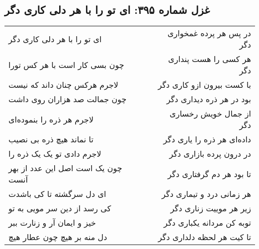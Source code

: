 \begin{center}
\section*{غزل شماره ۳۹۵: ای تو را با هر دلی کاری دگر}
\label{sec:395}
\begin{longtable}{l p{0.5cm} r}
ای تو را با هر دلی کاری دگر
&&
در پس هر پرده غمخواری دگر
\\
چون بسی کار است با هر کس تورا
&&
هر کسی را هست پنداری دگر
\\
لاجرم هرکس چنان داند که نیست
&&
با کست بیرون ازو کاری دگر
\\
چون جمالت صد هزاران روی داشت
&&
بود در هر ذره دیداری دگر
\\
لاجرم هر ذره را بنموده‌ای
&&
از جمال خویش رخساری دگر
\\
تا نماند هیچ ذره بی نصیب
&&
داده‌ای هر ذره را یاری دگر
\\
لاجرم دادی تو یک یک ذره را
&&
در درون پرده بازاری دگر
\\
چون یک است اصل این عدد از بهر آنست
&&
تا بود هر دم گرفتاری دگر
\\
ای دل سرگشته تا کی باشدت
&&
هر زمانی درد و تیماری دگر
\\
کی رسد از دین سر مویی به تو
&&
زیر هر موییت زناری دگر
\\
خیز و ایمان آر و زنارت ببر
&&
توبه کن مردانه یکباری دگر
\\
دل منه بر هیچ چون عطار هیچ
&&
تا کیت هر لحظه دلداری دگر
\\
\end{longtable}
\end{center}
